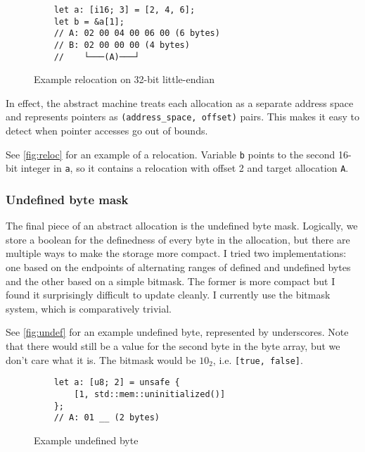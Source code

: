 \documentclass[twocolumn]{article}
\newcommand{\rust}[1]{\texttt{#1}}
\begin{document}
\begin{figure}[ht]
  \begin{verbatim}
    let a: [i16; 3] = [2, 4, 6];
    let b = &a[1];
    // A: 02 00 04 00 06 00 (6 bytes)
    // B: 02 00 00 00 (4 bytes)
    //    └───(A)───┘
  \end{verbatim}
  \caption{Example relocation on 32-bit little-endian}
  \label{fig:reloc}
\end{figure}

In effect, the abstract machine treats each allocation as a separate address space and represents
pointers as \rust{(address_space, offset)} pairs. This makes it easy to detect when pointer accesses
go out of bounds.

See \autoref{fig:reloc} for an example of a relocation. Variable \rust{b} points to the second
16-bit integer in \rust{a}, so it contains a relocation with offset 2 and target allocation
\rust{A}.

\subsubsection{Undefined byte mask}

The final piece of an abstract allocation is the undefined byte mask. Logically, we store a boolean
for the definedness of every byte in the allocation, but there are multiple ways to make the storage
more compact. I tried two implementations: one based on the endpoints of alternating ranges of
defined and undefined bytes and the other based on a simple bitmask. The former is more compact but
I found it surprisingly difficult to update cleanly. I currently use the bitmask system, which is
comparatively trivial.

See \autoref{fig:undef} for an example undefined byte, represented by underscores. Note that there
would still be a value for the second byte in the byte array, but we don't care what it is. The
bitmask would be $10_2$, i.e. \rust{[true, false]}.

\begin{figure}[hb]
  \begin{verbatim}
    let a: [u8; 2] = unsafe {
        [1, std::mem::uninitialized()]
    };
    // A: 01 __ (2 bytes)
  \end{verbatim}
  \caption{Example undefined byte}
  \label{fig:undef}
\end{figure}

\end{document}
